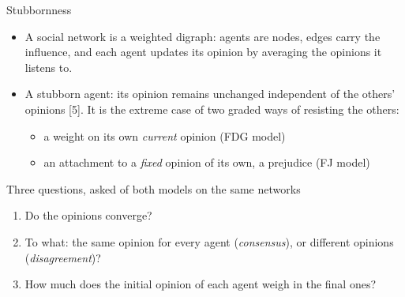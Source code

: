 \documentclass[10pt, aspectratio=169]{beamer}
\begin{document}
\begin{frame}[label=m-question]{Stubbornness}
  \begin{itemize}
    \item A social network is a weighted digraph: agents are nodes, edges carry the
          influence, and each agent updates its opinion by averaging the opinions it
          listens to.
    \item A \alert{stubborn} agent: its opinion remains unchanged independent of the
          others' opinions [5]. It is the extreme case of two graded ways of resisting
          the others:
          \begin{itemize}
            \item a weight on its own \emph{current} opinion \hfill (FDG model)
            \item an attachment to a \emph{fixed} opinion of its own, a prejudice
                  \hfill (FJ model)
          \end{itemize}
  \end{itemize}
  \vspace{3mm}
  \begin{alertblock}{Three questions, asked of both models on the same networks}
    \begin{enumerate}
      \item Do the opinions converge?
      \item To what: the same opinion for every agent (\emph{consensus}), or different
            opinions (\emph{disagreement})?
      \item How much does the initial opinion of each agent weigh in the final ones?
    \end{enumerate}
  \end{alertblock}
\end{frame}
\end{document}
